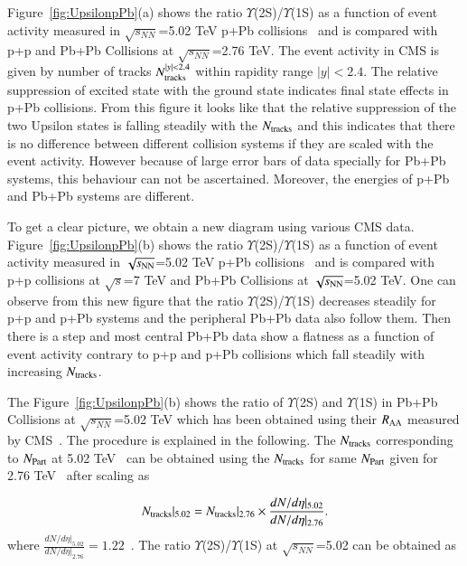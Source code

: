 Figure~\ref{fig:UpsilonpPb}(a) shows
the ratio $\Upsilon$(2S)/$\Upsilon$(1S) as a function of event activity measured in 
$\sqrt{s_{NN}}$=5.02 TeV p+Pb collisions~\cite{CMS:2013jsu} and is compared with p+p
and Pb+Pb Collisions at $\sqrt{s_{NN}}$=2.76 TeV.
The event activity in CMS is given by number of tracks $N_{\rm tracks}^{|y|<2.4}$ within rapidity
range $|y|<2.4$.
The relative suppression of excited state with the ground state indicates final
state effects in p+Pb collisions. 
From this figure it looks like that the relative suppression of
the two Upsilon states is falling steadily with the $N_{\rm tracks}$  and
this indicates that there is no difference between different collision systems if
they are scaled with the event activity. However because of large error bars
of data specially for Pb+Pb systems, this behaviour can not be ascertained.
Moreover, the energies of p+Pb and Pb+Pb systems are different.

To get a clear picture, we obtain a new diagram using various CMS data.
Figure~\ref{fig:UpsilonpPb}(b) shows the ratio $\Upsilon$(2S)/$\Upsilon$(1S) as a function of
event activity measured in $\sqrt{s_{\rm NN}}$=5.02 TeV p+Pb collisions~\cite{CMS:2013jsu}
and is compared with p+p collisions at $\sqrt{s}$=7 TeV \cite{CMS:2020fae} and
Pb+Pb Collisions at $\sqrt{s_{\rm NN}}$=5.02 TeV. One can observe from this new figure
that the ratio $\Upsilon$(2S)/$\Upsilon$(1S) decreases steadily for p+p and p+Pb systems
and the peripheral Pb+Pb data also follow them. Then there is a step and most central Pb+Pb
data show a flatness as a function of event activity contrary to p+p and
p+Pb collisions which fall steadily with increasing $N_{\rm tracks}$.

The  Figure~\ref{fig:UpsilonpPb}(b) shows the ratio of $\Upsilon$(2S)
and $\Upsilon$(1S) in Pb+Pb Collisions at
$\sqrt{s_{NN}}$=5.02 TeV which has been obtained using their $R_{\rm AA}$ measured by
CMS~\cite{CMS:2022wfi}. The procedure is explained in the following.
The $N_{\rm tracks}$ corresponding to $N_{\rm Part}$ at 5.02 TeV~\cite{CMS:2018zza}
can be obtained using the $N_{\rm tracks}$ for same $N_{\rm Part}$ given
for 2.76 TeV~\cite{CMS:2013jsu} after scaling as

\begin{equation}
N_{\rm tracks}|_{5.02} =  N_{\rm tracks}|_{2.76} \times \frac{dN/d\eta |_{5.02}} {dN/d\eta|_{2.76}}.
\end{equation}
where $\frac{dN/d\eta |_{5.02}} {dN/d\eta|_{2.76}}=1.22$~\cite{CMS:2018zza,CMS:2013jsu}.
The ratio $\Upsilon$(2S)/$\Upsilon$(1S) at $\sqrt{s_{NN}}$=5.02 can be obtained as 

